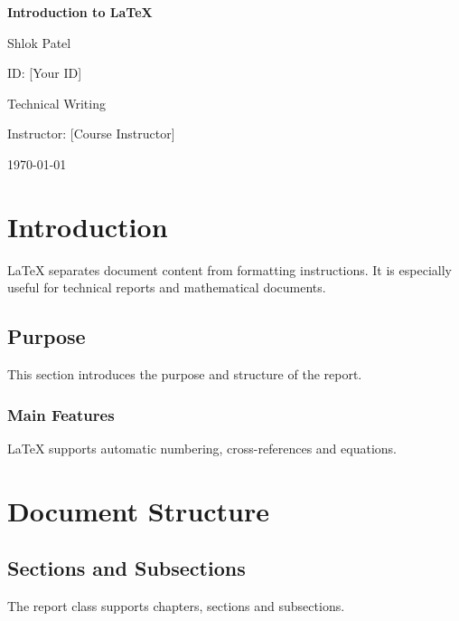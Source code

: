 \documentclass[12pt,a4paper]{report}
\newcommand{\StudentName}{Shlok Patel}
\newcommand{\StudentID}{[Your ID]}
\newcommand{\CourseTitle}{Technical Writing}
\newcommand{\InstructorName}{[Course Instructor]}
\begin{document}
\begin{titlepage}
  \thispagestyle{empty}
  \centering
  \vspace*{2cm}
  {\Huge\bfseries Introduction to \LaTeX\par}
  \vspace{2cm}
  {\Large \StudentName\par}
  \vspace{0.5cm}
  {\large ID: \StudentID\par}
  \vspace{0.5cm}
  {\large \CourseTitle\par}
  \vspace{0.5cm}
  {\large Instructor: \InstructorName\par}
  \vfill
  {\large \today\par}
\end{titlepage}

\begin{abstract}
This document introduces LaTeX as a document preparation system.
It demonstrates document structure, mathematical typesetting,
tables, figures, citations, and presentation-related workflows.
\end{abstract}

\tableofcontents

\chapter{Introduction}
LaTeX separates document content from formatting instructions.
It is especially useful for technical reports and mathematical documents.

\section{Purpose}
This section introduces the purpose and structure of the report.

\subsection{Main Features}
LaTeX supports automatic numbering, cross-references and equations.

\chapter{Document Structure}
\section{Sections and Subsections}
The report class supports chapters, sections and subsections.
\end{document}
